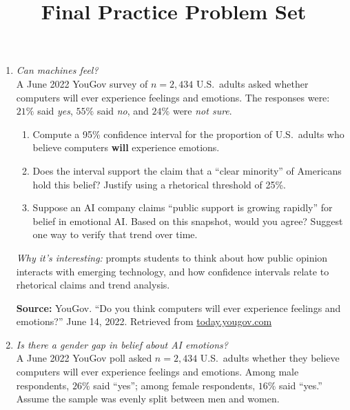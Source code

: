 \documentclass[11pt]{article}
\title{Final Practice Problem Set}
\author{}
\date{}
\begin{document}
\maketitle

\begin{enumerate}[label=\textbf{Q\,\arabic*:}, left=0pt]

\item  \emph{Can machines feel?} \\
      A June 2022 YouGov survey of $n = 2{,}434$ U.S.\ adults asked whether computers will ever experience feelings and emotions. The responses were: $21\%$ said \emph{yes}, $55\%$ said \emph{no}, and $24\%$ were \emph{not sure}.
      \begin{enumerate}[label=(\alph*)]
         \item Compute a 95\% confidence interval for the proportion of U.S.\ adults who believe computers \textbf{will} experience emotions.
         \item Does the interval support the claim that a “clear minority” of Americans hold this belief? Justify using a rhetorical threshold of 25\%.
         \item Suppose an AI company claims “public support is growing rapidly” for belief in emotional AI. Based on this snapshot, would you agree? Suggest one way to verify that trend over time.
      \end{enumerate}
      \textit{Why it’s interesting:} prompts students to think about how public opinion interacts with emerging technology, and how confidence intervals relate to rhetorical claims and trend analysis.

      \vspace{0.5em}
      \noindent\textbf{Source:} YouGov. “Do you think computers will ever experience feelings and emotions?” June 14, 2022. Retrieved from \href{https://today.yougov.com/topics/politics/survey-results/daily/2022/06/14/0cd0f/1}{today.yougov.com}

\item  \emph{Is there a gender gap in belief about AI emotions?} \\
      A June 2022 YouGov poll asked $n = 2{,}434$ U.S.\ adults whether they believe computers will ever experience feelings and emotions. Among male respondents, $26\%$ said “yes”; among female respondents, $16\%$ said “yes.” Assume the sample was evenly split between men and women.


\end{enumerate}
\end{document}
